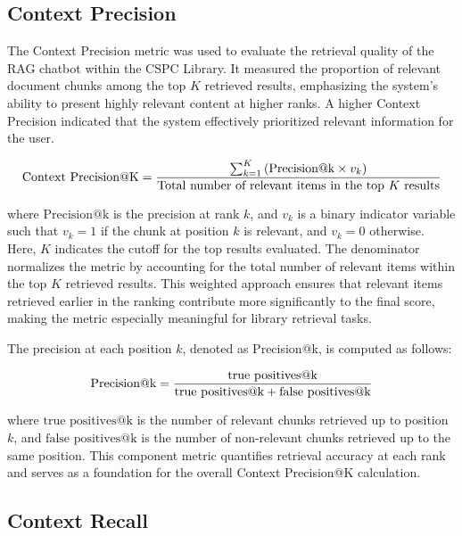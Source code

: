 \begin{refsection}
\subsection*{Context Precision}

The Context Precision metric was used to evaluate the retrieval quality of the RAG chatbot within the CSPC Library. It measured the proportion of relevant document chunks among the top $K$ retrieved results, emphasizing the system's ability to present highly relevant content at higher ranks. A higher Context Precision indicated that the system effectively prioritized relevant information for the user.

\begin{equation}
\centering
\text{Context Precision@K} = 
\frac{
    \sum_{k=1}^{K} \left( \text{Precision@k} \times v_k \right)
}{
    \text{Total number of relevant items in the top } K \text{ results}
}
\end{equation}

where $\text{Precision@k}$ is the precision at rank $k$, and $v_k$ is a binary indicator variable such that $v_k = 1$ if the chunk at position $k$ is relevant, and $v_k = 0$ otherwise. Here, $K$ indicates the cutoff for the top results evaluated. The denominator normalizes the metric by accounting for the total number of relevant items within the top $K$ retrieved results. This weighted approach ensures that relevant items retrieved earlier in the ranking contribute more significantly to the final score, making the metric especially meaningful for library retrieval tasks.

The precision at each position $k$, denoted as Precision@k, is computed as follows:

\begin{equation}
\centering
\text{Precision@k} = 
\frac{
    \text{true positives@k}
}{
    \text{true positives@k} + \text{false positives@k}
}
\end{equation}

where $\text{true positives@k}$ is the number of relevant chunks retrieved up to position $k$, and $\text{false positives@k}$ is the number of non-relevant chunks retrieved up to the same position. This component metric quantifies retrieval accuracy at each rank and serves as a foundation for the overall Context Precision@K calculation.

\subsection*{Context Recall}


\end{refsection}
